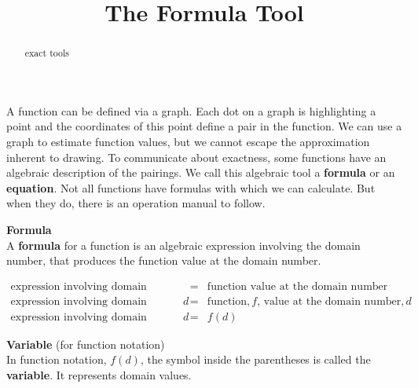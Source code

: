 \documentclass{ximera}
\title{The Formula Tool}
\begin{document}
\begin{abstract}
exact tools
\end{abstract}
\maketitle



A function can be defined via a graph. Each dot on a graph is highlighting a point and the coordinates of this point define a pair in the function. We can use a graph to estimate function values, but we cannot escape the approximation inherent to drawing.  To communicate about exactness, some functions have an algebraic description of the pairings.  We call this algebraic tool a \textbf{formula} or an \textbf{equation}. Not all functions have formulas with which we can calculate.  But when they do, there is an operation manual to follow.



\begin{definition}  \textbf{\textcolor{green!50!black}{Formula}} \\ 

A \textbf{formula} for a function is an algebraic expression involving the domain number, that produces the function value at the domain number.
\end{definition}



\[
\begin{array}{rcl}
     \text{expression involving domain number} & = &  \text{function value at the domain number}  \\ 
      \text{expression involving domain number,} \, d  & = &  \text{function,} \, f \text{, value at the domain number,} \, d \\ 
      \text{expression involving domain number,} \, d & = & f(d) 
\end{array}
\]







\begin{definition}  \textbf{\textcolor{green!50!black}{Variable}} (for function notation) \\ 


In function notation, $f(d)$, the symbol inside the parentheses is called the \textbf{variable}. It represents domain values.
\end{definition}
\end{document}
